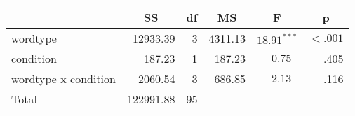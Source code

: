 \begin{center}
\begin{tabular}{lrrrrr}
\toprule
 & \multicolumn{1}{c}{\textbf{SS}} & \multicolumn{1}{c}{\textbf{df}} & \multicolumn{1}{c}{\textbf{MS}} & \multicolumn{1}{c}{\textbf{F}} & \multicolumn{1}{c}{\textbf{p}} \\
\midrule
wordtype & 12933.39 & 3 & 4311.13 & $18.91^{***}$ & $< .001$ \\
condition & 187.23 & 1 & 187.23 & $0.75^{   \ \ \ }$ & .405 \\
wordtype x condition & 2060.54 & 3 & 686.85 & $2.13^{   \ \ \ }$ & .116 \\
\midrule
Total & 122991.88 & 95 \\
\bottomrule
\end{tabular}
\end{center}